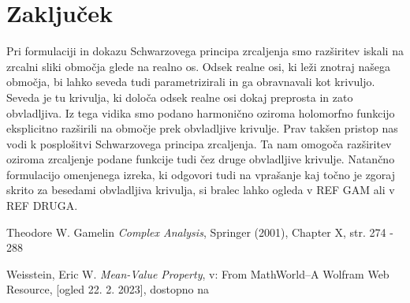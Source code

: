 \documentclass[mat1, tisk]{fmfdelo}
\begin{document}
\section{Zaključek}
    Pri formulaciji in dokazu Schwarzovega principa zrcaljenja smo razširitev iskali na zrcalni sliki območja glede na realno os. 
    Odsek realne osi, ki leži znotraj našega območja, bi lahko seveda tudi parametrizirali in ga obravnavali kot krivuljo. 
    Seveda je tu krivulja, ki določa odsek realne osi dokaj preprosta in zato obvladljiva.
    Iz tega vidika smo podano harmonično oziroma holomorfno funkcijo eksplicitno razširili na območje prek obvladljive krivulje.
    Prav takšen pristop nas vodi k posplošitvi Schwarzovega principa zrcaljenja. 
    Ta nam omogoča razširitev oziroma zrcaljenje podane funkcije tudi čez druge obvladljive krivulje. 
    Natančno formulacijo omenjenega izreka, ki odgovori tudi na vprašanje kaj točno je zgoraj skrito za besedami obvladljiva krivulja, si bralec lahko ogleda v REF GAM ali v REF DRUGA.


\begin{thebibliography}{9}
    Theodore W. Gamelin \emph{Complex Analysis}, Springer (2001), Chapter X, str. 274 - 288

    Weisstein, Eric W. \emph{Mean-Value Property}, v: From MathWorld--A Wolfram Web Resource, [ogled 22. 2. 2023], dostopno na
\end{thebibliography}
\end{document}
